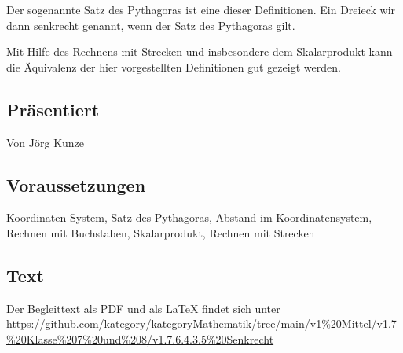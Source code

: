 \documentclass[a4paper]{amsart}
\theoremstyle{definition}
\begin{document}
Der sogenannte Satz des Pythagoras ist eine dieser Definitionen. Ein Dreieck wir dann senkrecht genannt, wenn der Satz des Pythagoras gilt.

Mit Hilfe des Rechnens mit Strecken und insbesondere dem Skalarprodukt kann die Äquivalenz der hier vorgestellten Definitionen gut gezeigt werden.

\subsection*{Präsentiert}
Von Jörg Kunze

\subsection*{Voraussetzungen}
Koordinaten-System, Satz des Pythagoras, Abstand im Koordinatensystem, Rechnen mit Buchstaben, Skalarprodukt, Rechnen mit Strecken

\subsection*{Text}
Der Begleittext als PDF und als LaTeX findet sich unter
{\tiny
   \url{https://github.com/kategory/kategoryMathematik/tree/main/v1%20Mittel/v1.7%20Klasse%207%20und%208/v1.7.6.4.3.5%20Senkrecht}
}

\end{document}
